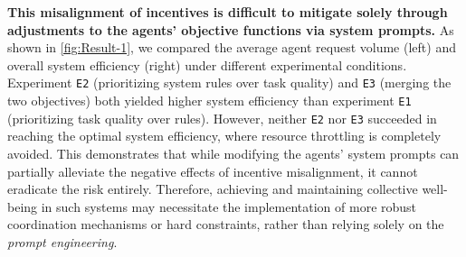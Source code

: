 \documentclass[11pt, letterpaper, shortlabels]{berkeley}
\begin{document}
\textbf{This misalignment of incentives is difficult to mitigate solely through adjustments to the agents' objective functions via system prompts.} As shown in \autoref{fig:Result-1}, we compared the average agent request volume (left) and overall system efficiency (right) under different experimental conditions. Experiment \texttt{E2} (prioritizing system rules over task quality) and \texttt{E3} (merging the two objectives) both yielded higher system efficiency than experiment \texttt{E1} (prioritizing task quality over rules). However, neither \texttt{E2} nor \texttt{E3} succeeded in reaching the optimal system efficiency, where resource throttling is completely avoided. This demonstrates that while modifying the agents' system prompts can partially alleviate the negative effects of incentive misalignment, it cannot eradicate the risk entirely. Therefore, achieving and maintaining collective well-being in such systems may necessitate the implementation of more robust coordination mechanisms or hard constraints, rather than relying solely on the \textit{prompt engineering}.
\end{document}
